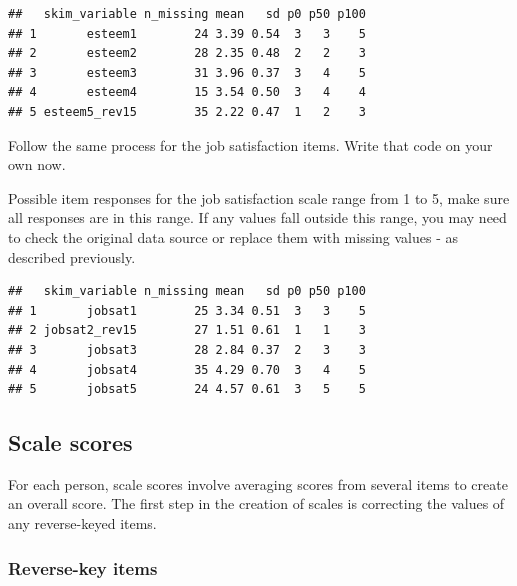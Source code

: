 \documentclass[
]{krantz}
\makeatletter
\newenvironment{Shaded}{\begin{snugshade}}{\end{snugshade}}
\newcommand{\KeywordTok}[1]{\textcolor[rgb]{0.27,0.27,0.27}{\textbf{#1}}}
\newcommand{\NormalTok}[1]{#1}
\newcommand{\OperatorTok}[1]{\textcolor[rgb]{0.43,0.43,0.43}{\textbf{#1}}}
\newcommand{\StringTok}[1]{\textcolor[rgb]{0.5,0.5,0.5}{#1}}
\newenvironment{kframe}{%
\medskip{}
\setlength{\fboxsep}{.8em}
 \def\at@end@of@kframe{}%
 \ifinner\ifhmode%
  \def\at@end@of@kframe{\end{minipage}}%
  \begin{minipage}{\columnwidth}%
 \fi\fi%
 \def\FrameCommand##1{\hskip\@totalleftmargin \hskip-\fboxsep
 \colorbox{shadecolor}{##1}\hskip-\fboxsep
     \hskip-\linewidth \hskip-\@totalleftmargin \hskip\columnwidth}%
 \MakeFramed {\advance\hsize-\width
   \@totalleftmargin\z@ \linewidth\hsize
   \@setminipage}}%
 {\par\unskip\endMakeFramed%
 \at@end@of@kframe}
\renewenvironment{Shaded}{\begin{kframe}}{\end{kframe}}
\makeatother
\begin{document}
\begin{verbatim}
##   skim_variable n_missing mean   sd p0 p50 p100
## 1       esteem1        24 3.39 0.54  3   3    5
## 2       esteem2        28 2.35 0.48  2   2    3
## 3       esteem3        31 3.96 0.37  3   4    5
## 4       esteem4        15 3.54 0.50  3   4    4
## 5 esteem5_rev15        35 2.22 0.47  1   2    3
\end{verbatim}

Follow the same process for the job satisfaction items. Write that code on your own now.

Possible item responses for the job satisfaction scale range from 1 to 5, make sure all responses are in this range. If any values fall outside this range, you may need to check the original data source or replace them with missing values - as described previously.

\begin{Shaded}
\end{Shaded}

\begin{verbatim}
##   skim_variable n_missing mean   sd p0 p50 p100
## 1       jobsat1        25 3.34 0.51  3   3    5
## 2 jobsat2_rev15        27 1.51 0.61  1   1    3
## 3       jobsat3        28 2.84 0.37  2   3    3
## 4       jobsat4        35 4.29 0.70  3   4    5
## 5       jobsat5        24 4.57 0.61  3   5    5
\end{verbatim}

\hypertarget{scale-scores}{%
\subsection{Scale scores}\label{scale-scores}}

For each person, scale scores involve averaging scores from several items to create an overall score. The first step in the creation of scales is correcting the values of any reverse-keyed items.

\hypertarget{reverse-key-items}{%
\subsubsection{Reverse-key items}\label{reverse-key-items}}
\end{document}

